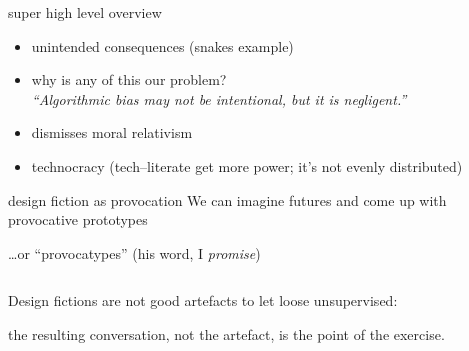\documentclass[presentation]{subfiles}
\begin{document}
\begin{frame}{super high level overview}
\begin{itemize}
  \item unintended consequences (snakes example)
  \item why is any of this our problem?\\
    \textit{``Algorithmic bias may not be intentional, but it is negligent.''}
  \item dismisses \alert{moral relativism} 
  \item \alert{technocracy} (tech--literate get more power; it's not evenly distributed)
\end{itemize}

\end{frame}

\begin{frame}{design fiction as provocation}
We can imagine futures and come up with provocative prototypes

\dots or ``\alert{provocatypes}'' (his word, I \textit{promise})

\begin{columns}[t]
\begin{column}{0.4\textwidth}
\end{column}

\begin{column}{0.6\textwidth}

\end{column}

\end{columns}
\end{frame}

\begin{frame}[standout]

{\large Design fictions are not good artefacts to let loose unsupervised:}

\alert{the resulting conversation}, not the artefact, is the point of the exercise.
\end{frame}
\end{document}
